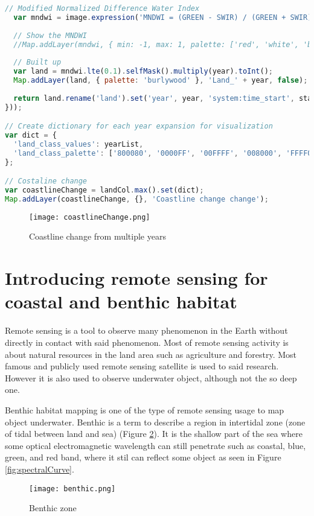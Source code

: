 \begin{lstlisting}[language=JavaScript, label={code:coastlineChange}, caption={GEE script to model coastline change}]
  // Modified Normalized Difference Water Index
  var mndwi = image.expression('MNDWI = (GREEN - SWIR) / (GREEN + SWIR)', bandMap);
  
  // Show the MNDWI
  //Map.addLayer(mndwi, { min: -1, max: 1, palette: ['red', 'white', 'blue'] }, 'MNDWI_' + year, false);
  
  // Built up
  var land = mndwi.lte(0.1).selfMask().multiply(year).toInt();
  Map.addLayer(land, { palette: 'burlywood' }, 'Land_' + year, false);
  
  return land.rename('land').set('year', year, 'system:time_start', start);
}));

// Create dictionary for each year expansion for visualization
var dict = {
  'land_class_values': yearList,
  'land_class_palette': ['800080', '0000FF', '00FFFF', '008000', 'FFFF00', 'FFA500', 'FF0000']
};

// Costaline change
var coastlineChange = landCol.max().set(dict);
Map.addLayer(coastlineChange, {}, 'Coastline change change');
\end{lstlisting}

\begin{figure}[htbp]
	\label{fig:coastlineChange}
	\centering
	\texttt{[image: coastlineChange.png]}
	\caption{Coastline change from multiple years}
\end{figure}

\section{Introducing remote sensing for coastal and benthic habitat}
Remote sensing is a tool to observe many phenomenon in the Earth without directly in contact with said phenomenon. Most of remote sensing activity is about natural resources in the land area such as agriculture and forestry. Most famous and publicly used remote sensing satellite is used to said research. However it is also used to observe underwater object, although not the so deep one.

Benthic habitat mapping is one of the type of remote sensing usage to map object underwater. Benthic is a term to describe a region in intertidal zone (zone of tidal between land and sea) (Figure \ref{fig:benthic}). It is the shallow part of the sea where some optical electromagnetic wavelength can still penetrate such as coastal, blue, green, and red band, where it stil can reflect some object as seen in Figure \ref{fig:spectralCurve}.

\begin{figure}[htbp]
	\label{fig:benthic}
	\centering
	\texttt{[image: benthic.png]}
	\caption{Benthic zone \cite{nababan2021shallow}}	
\end{figure}

